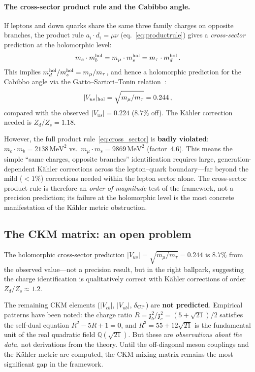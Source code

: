 \documentclass[aps,prd,twocolumn,showpacs,preprintnumbers,superscriptaddress,floatfix]{revtex4-2}
\newcommand{\MeV}{\,\mathrm{MeV}}
\newcommand{\zch}{\mathfrak{z}}
\begin{document}
\paragraph{The cross-sector product rule and the Cabibbo angle.}
If leptons and down quarks share the same three family charges
on opposite branches, the product rule $a_i \cdot d_i = \mu\nu$
(eq.~\ref{eq:productrule}) gives a \emph{cross-sector}
prediction at the holomorphic level:
\begin{equation}
  m_e \cdot m_b^{\rm hol} = m_\mu \cdot m_s^{\rm hol}
  = m_\tau \cdot m_d^{\rm hol}\,.
  \label{eq:cross_sector}
\end{equation}
This implies $m_d^{\rm hol}/m_s^{\rm hol} = m_\mu/m_\tau$,
and hence a holomorphic prediction for the Cabibbo angle via the
Gatto--Sartori--Tonin relation~\cite{GattoSartoriTonin:1968}:
\begin{equation}
  |V_{us}|_{\rm hol} = \sqrt{m_\mu/m_\tau} = 0.244\,,
  \label{eq:Vus_hol}
\end{equation}
compared with the observed $|V_{us}| = 0.224$ ($8.7\%$ off).
The K\"ahler correction needed is $Z_d/Z_s = 1.18$.

However, the full product rule~\eqref{eq:cross_sector} is
\textbf{badly violated}: $m_e \cdot m_b = 2138\MeV^2$ vs.\
$m_\mu \cdot m_s = 9869\MeV^2$ (factor~4.6).
This means the simple ``same charges, opposite branches''
identification requires large, generation-dependent K\"ahler
corrections across the lepton--quark boundary---far beyond the
mild ($< 1\%$) corrections needed within the lepton sector alone.
The cross-sector product rule is therefore an \emph{order of
magnitude} test of the framework, not a precision prediction;
its failure at the holomorphic level is the most concrete
manifestation of the K\"ahler metric obstruction.

\subsection{The CKM matrix: an open problem}

The holomorphic cross-sector prediction
$|V_{us}| = \sqrt{m_\mu/m_\tau} = 0.244$ is $8.7\%$ from the
observed value---not a precision result, but in the right
ballpark, suggesting the charge identification is qualitatively
correct with K\"ahler corrections of order $Z_d/Z_s \approx 1.2$.

The remaining CKM elements ($|V_{cb}|$, $|V_{ub}|$,
$\delta_{\rm CP}$) are \textbf{not predicted}.
Empirical patterns have been noted: the charge ratio
$R = \zch_b^2/\zch_c^2 = (5+\sqrt{21})/2$ satisfies the
self-dual equation $R^2 - 5R + 1 = 0$, and
$R^3 = 55 + 12\sqrt{21}$ is the fundamental unit of the real
quadratic field $\mathbb{Q}(\sqrt{21})$.
But these are \emph{observations about the data}, not derivations
from the theory.
Until the off-diagonal meson couplings and the K\"ahler metric
are computed, the CKM mixing matrix remains the most significant
gap in the framework.
\end{document}
